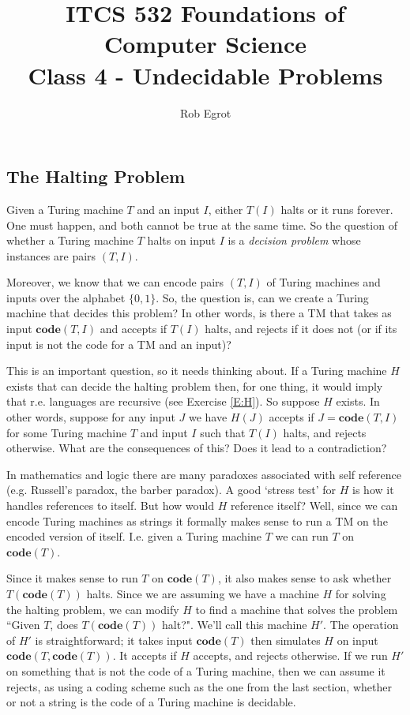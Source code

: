 \documentclass{article}
\title{ITCS 532 Foundations of Computer Science\\
Class 4 - Undecidable Problems}
\author{Rob Egrot}
\date{}
\theoremstyle{plain}
\theoremstyle{definition}
\newcommand{\co}{\mathbf{code}}
\begin{document}
\maketitle
\subsection{The Halting Problem}
Given a Turing machine $T$ and an input $I$, either $T(I)$ halts or it runs forever. One must happen, and both cannot be true at the same time. So the question of whether a Turing machine $T$ halts on input $I$ is a \emph{decision problem} whose instances are pairs $(T,I)$. 

Moreover, we know that we can encode pairs $(T,I)$ of Turing machines and inputs over the alphabet $\{0,1\}$. So, the question is, can we create a Turing machine that decides this problem? In other words, is there a TM that takes as input $\co(T,I)$ and accepts if $T(I)$ halts, and rejects if it does not (or if its input is not the code for a TM and an input)? 

This is an important question, so it needs thinking about. If a Turing machine $H$ exists that can decide the halting problem then, for one thing, it would imply that r.e. languages are recursive (see Exercise \ref{E:H}). So suppose $H$ exists. In other words, suppose for any input $J$ we have $H(J)$ accepts if $J=\co(T,I)$ for some Turing machine $T$ and input $I$ such that $T(I)$ halts, and rejects otherwise. What are the consequences of this? Does it lead to a contradiction? 

In mathematics and logic there are many paradoxes associated with self reference (e.g. Russell's paradox, the barber paradox). A good `stress test' for $H$ is how it handles references to itself. But how would $H$ reference itself? Well, since we can encode Turing machines as strings it formally makes sense to run a TM on the encoded version of itself. I.e. given a Turing machine $T$ we can run $T$ on $\co(T)$. 

Since it makes sense to run $T$ on $\co(T)$, it also makes sense to ask whether $T(\co(T))$ halts. Since we are assuming we have a machine $H$ for solving the halting problem, we can modify $H$ to find a machine that solves the problem ``Given $T$, does $T(\co(T))$ halt?". We'll call this machine $H'$. The operation of $H'$ is straightforward; it takes input $\co(T)$ then simulates $H$ on input $\co(T,\co(T))$. It accepts if $H$ accepts, and rejects otherwise. If we run $H'$ on something that is not the code of a Turing machine, then we can assume it rejects, as using a coding scheme such as the one from the last section, whether or not a string is the code of a Turing machine is decidable. 
\end{document}
